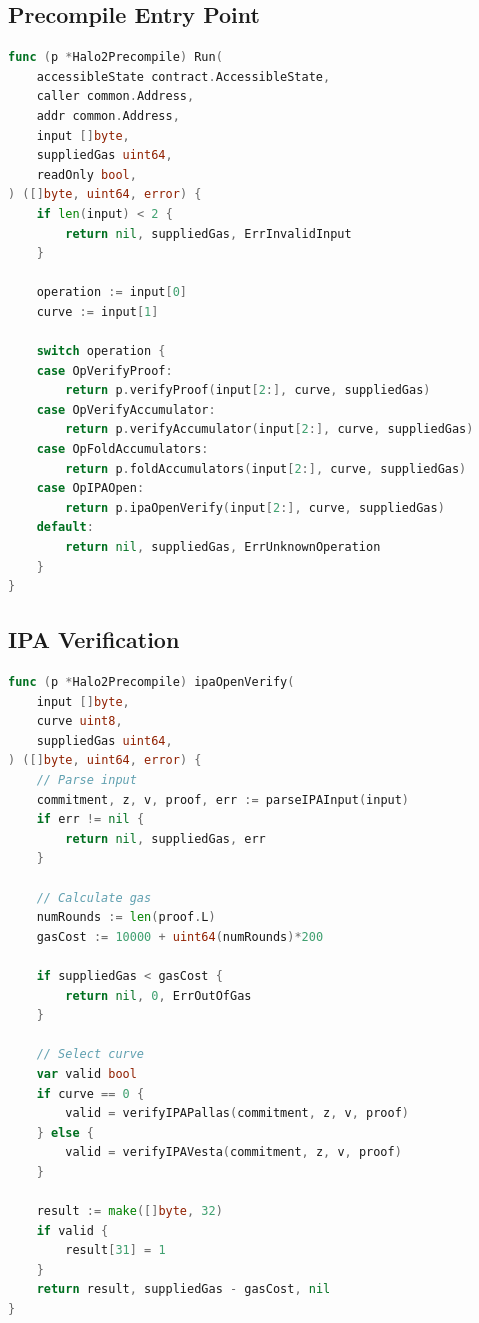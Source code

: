 \documentclass[11pt,a4paper]{article}
\theoremstyle{definition}
\begin{document}
\subsection{Precompile Entry Point}

\begin{lstlisting}[language=Go, caption={Halo2 Precompile Implementation}]
func (p *Halo2Precompile) Run(
    accessibleState contract.AccessibleState,
    caller common.Address,
    addr common.Address,
    input []byte,
    suppliedGas uint64,
    readOnly bool,
) ([]byte, uint64, error) {
    if len(input) < 2 {
        return nil, suppliedGas, ErrInvalidInput
    }

    operation := input[0]
    curve := input[1]

    switch operation {
    case OpVerifyProof:
        return p.verifyProof(input[2:], curve, suppliedGas)
    case OpVerifyAccumulator:
        return p.verifyAccumulator(input[2:], curve, suppliedGas)
    case OpFoldAccumulators:
        return p.foldAccumulators(input[2:], curve, suppliedGas)
    case OpIPAOpen:
        return p.ipaOpenVerify(input[2:], curve, suppliedGas)
    default:
        return nil, suppliedGas, ErrUnknownOperation
    }
}
\end{lstlisting}

\subsection{IPA Verification}

\begin{lstlisting}[language=Go, caption={IPA Opening Verification}]
func (p *Halo2Precompile) ipaOpenVerify(
    input []byte,
    curve uint8,
    suppliedGas uint64,
) ([]byte, uint64, error) {
    // Parse input
    commitment, z, v, proof, err := parseIPAInput(input)
    if err != nil {
        return nil, suppliedGas, err
    }

    // Calculate gas
    numRounds := len(proof.L)
    gasCost := 10000 + uint64(numRounds)*200

    if suppliedGas < gasCost {
        return nil, 0, ErrOutOfGas
    }

    // Select curve
    var valid bool
    if curve == 0 {
        valid = verifyIPAPallas(commitment, z, v, proof)
    } else {
        valid = verifyIPAVesta(commitment, z, v, proof)
    }

    result := make([]byte, 32)
    if valid {
        result[31] = 1
    }
    return result, suppliedGas - gasCost, nil
}
\end{lstlisting}
\end{document}
